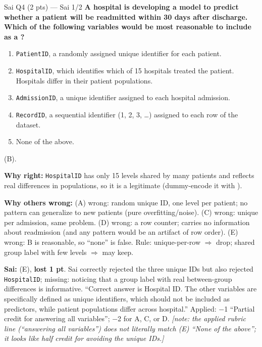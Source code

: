 \begin{qbox}{Sai Q4 (2 pts) --- Sai 1/2}
\textbf{A hospital is developing a model to predict whether a patient will be readmitted within 30 days after discharge. Which of the following variables would be most reasonable to include as a ?}
\begin{enumerate}[label=(\Alph*),leftmargin=1.6em,itemsep=0pt]
\item \texttt{PatientID}, a randomly assigned unique identifier for each patient.
\item \texttt{HospitalID}, which identifies which of 15 hospitals treated the patient. Hospitals differ in their patient populations.
\item \texttt{AdmissionID}, a unique identifier assigned to each hospital admission.
\item \texttt{RecordID}, a sequential identifier (1, 2, 3, \dots) assigned to each row of the dataset.
\item None of the above.
\end{enumerate}
\ans (B).
\par\textbf{Why right:} \texttt{HospitalID} has only 15 levels shared by many patients and reflects real differences in populations, so it is a legitimate  (dummy-encode it with ). 
\par\textbf{Why others wrong:}
(A) wrong: random unique ID, one level per patient; no pattern can generalize to new patients (pure overfitting/noise).
(C) wrong: unique per admission, same problem.
(D) wrong: a row counter; carries no information about readmission (and any pattern would be an artifact of row order).
(E) wrong: B is reasonable, so ``none'' is false.
Rule: unique-per-row  $\Rightarrow$ drop; shared group label with few levels $\Rightarrow$ may keep.
\par\textbf{\color{dblue}Sai:} (E), \textbf{lost 1 pt}. Sai correctly rejected the three unique IDs but also rejected \texttt{HospitalID}; missing: noticing that a group label with real between-group differences is informative. \grader ``Correct answer is Hospital ID. The other variables are specifically defined as unique identifiers, which should not be included as predictors, while patient populations differ across hospital.'' Applied: $-$1 ``Partial credit for answering all variables''; $-$2 for A, C, or D.
{\color{figgray}\itshape [note: the applied rubric line (``answering all variables'') does not literally match (E) ``None of the above''; it looks like half credit for avoiding the unique IDs.]}
\end{qbox}


